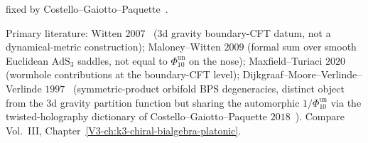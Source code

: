 \begin{remark}
\begin{enumerate}[label=\textup{(\Roman*)}]
 fixed by Costello--Gaiotto--Paquette~\cite{CostelloGaiottoPaquette2018}.
\end{enumerate}
Primary literature: Witten $2007$~\cite{Witten2007}
($3$d gravity boundary-CFT datum, not a dynamical-metric construction);
Maloney--Witten $2009$ (formal sum over smooth Euclidean
$\mathrm{AdS}_3$ saddles, not equal to $\Phi_{10}^{\mathrm{un}}$ on the nose);
Maxfield--Turiaci $2020$ (wormhole contributions at the boundary-CFT
level); Dijkgraaf--Moore--Verlinde--Verlinde
$1997$~\cite{DijkgraafMooreVerlindeVerlinde1997} (symmetric-product
orbifold BPS degeneracies, distinct object from the $3$d gravity
partition function but sharing the automorphic $1/\Phi_{10}^{\mathrm{un}}$ via
the twisted-holography dictionary of
Costello--Gaiotto--Paquette $2018$~\cite{CostelloGaiottoPaquette2018}).
Compare Vol.~III,
Chapter~\ref{V3-ch:k3-chiral-bialgebra-platonic}.
\end{remark}
